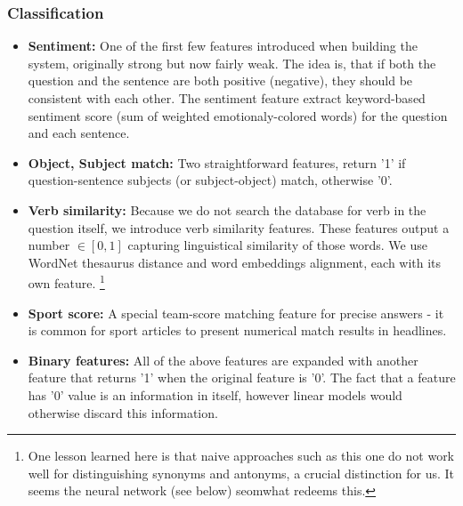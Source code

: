 \documentclass[11pt,a4paper]{article}
\begin{document}
\subsubsection{Classification}
\begin{itemize}
\item \textbf{Sentiment:} One of the first few features introduced when building the system, originally strong but now fairly weak. The idea is, that if both the question and the sentence are both positive (negative), they should be consistent with each other. The sentiment feature extract keyword-based sentiment score (sum of weighted emotionaly-colored words) for the question and each sentence.

\item\textbf{Object, Subject match:} Two straightforward features, return '1' if question-sentence subjects (or subject-object) match, otherwise '0'.

\item\textbf{Verb similarity:} Because we do not search the database for verb in the question itself, we introduce verb similarity features. These features output a number $\in [0,1]$ capturing linguistical similarity of those words. We use WordNet thesaurus distance and word embeddings alignment, each with its own feature.%
\footnote{One lesson learned here is that naive approaches such as this one do not work well for distinguishing synonyms and antonyms, a crucial distinction for us.  It seems the neural network (see below) seomwhat redeems this.}

\item\textbf{Sport score:} A special team-score matching feature for precise answers - it is common for sport articles to present numerical match results in headlines.

\item\textbf{Binary features:} All of the above features are expanded with another feature that returns '1' when the original feature is '0'. The fact that a feature has '0' value is an information in itself, however linear models would otherwise discard this information.

\end{itemize}
\end{document}
